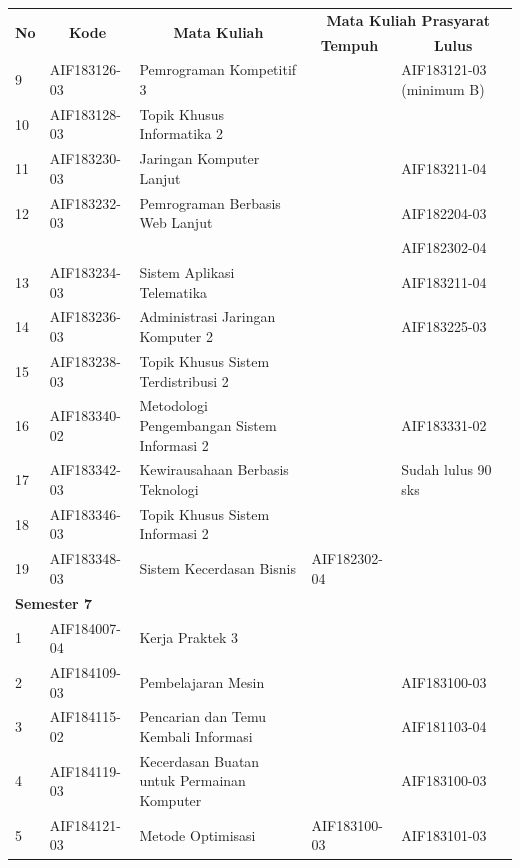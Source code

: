 \documentclass[a4paper,twoside]{article}
\begin{document}
\begin{enumerate}
\begin{enumerate}
\begin{table}[H]
	\centering
		\begin{tabular}{|p{0.5cm}|p{2.85cm}|p{4.95cm}|p{2.7cm}|p{2.7cm}|}
			\hline
			\multicolumn{1}{|c|}{\multirow{2}{*}{\textbf{No}}} & \multicolumn{1}{c|}{\multirow{2}{*}{\textbf{Kode}}} & \multicolumn{1}{c|}{\multirow{2}{*}{\textbf{Mata Kuliah}}} & \multicolumn{2}{c|}{\textbf{Mata Kuliah Prasyarat}} \\ \cline{4-5}
			 &  &  & \multicolumn{1}{c|}{\textbf{Tempuh}} & \multicolumn{1}{c|}{\textbf{Lulus}} \\ \hline
			9 & AIF183126-03 & Pemrograman Kompetitif 3 &  & AIF183121-03 (minimum B) \\ \hline
10 & AIF183128-03 & Topik Khusus Informatika 2 &  &  \\ \hline
11 & AIF183230-03 & Jaringan Komputer Lanjut &  & AIF183211-04 \\ \hline
12 & AIF183232-03 & Pemrograman Berbasis Web Lanjut &  & AIF182204-03 \\
 &  &  &  & AIF182302-04 \\ \hline
13 & AIF183234-03 & Sistem Aplikasi Telematika &  & AIF183211-04 \\ \hline
14 & AIF183236-03 & Administrasi Jaringan Komputer 2 &  & AIF183225-03 \\ \hline
15 & AIF183238-03 & Topik Khusus Sistem Terdistribusi 2 &  &  \\ \hline
16 & AIF183340-02 & Metodologi Pengembangan Sistem Informasi 2 &  & AIF183331-02 \\ \hline
17 & AIF183342-03 & Kewirausahaan Berbasis Teknologi &  & Sudah lulus 90 sks \\ \hline
18 & AIF183346-03 & Topik Khusus Sistem Informasi 2 &  &  \\ \hline
19 & AIF183348-03 & Sistem Kecerdasan Bisnis & AIF182302-04 &  \\ \hline
\multicolumn{5}{|l|}{\textbf{Semester 7}} \\ \hline
1 & AIF184007-04 & Kerja Praktek 3 &  &  \\ \hline
2 & AIF184109-03 & Pembelajaran Mesin &  & AIF183100-03 \\ \hline
3 & AIF184115-02 & Pencarian dan Temu Kembali Informasi &  & AIF181103-04 \\ \hline
4 & AIF184119-03 & Kecerdasan Buatan untuk Permainan Komputer &  & AIF183100-03 \\ \hline
5 & AIF184121-03 & Metode Optimisasi & AIF183100-03 & AIF183101-03 \\ \hline

\end{tabular}
\end{table}
\end{enumerate}
\end{enumerate}
\end{document}
